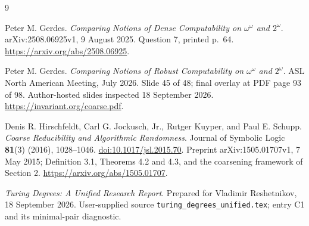 \documentclass[11pt,a4paper]{article}
\theoremstyle{definition}
\theoremstyle{remark}
\begin{document}
\begin{thebibliography}{9}
\raggedright
{}
Peter M. Gerdes.
\emph{Comparing Notions of Dense Computability on $\omega^\omega$ and
$2^\omega$}. arXiv:2508.06925v1, 9 August 2025.
Question 7, printed p.~64.
\url{https://arxiv.org/abs/2508.06925}.

Peter M. Gerdes.
\emph{Comparing Notions of Robust Computability on $\omega^\omega$ and
$2^\omega$}. ASL North American Meeting, July 2026.
Slide 45 of 48; final overlay at PDF page 93 of 98.
Author-hosted slides inspected 18 September 2026.
\url{https://invariant.org/coarse.pdf}.

Denis R. Hirschfeldt, Carl G. Jockusch, Jr., Rutger Kuyper, and Paul E. Schupp.
\emph{Coarse Reducibility and Algorithmic Randomness}.
Journal of Symbolic Logic \textbf{81}(3) (2016), 1028--1046.
\href{https://doi.org/10.1017/jsl.2015.70}{doi:10.1017/jsl.2015.70}.
Preprint arXiv:1505.01707v1, 7 May 2015; Definition 3.1,
Theorems 4.2 and 4.3, and the coarsening framework of Section 2.
\url{https://arxiv.org/abs/1505.01707}.

\emph{Turing Degrees: A Unified Research Report}.
Prepared for Vladimir Reshetnikov, 18 September 2026.
User-supplied source \texttt{turing\_degrees\_unified.tex};
entry C1 and its minimal-pair diagnostic.
\end{thebibliography}
\end{document}
